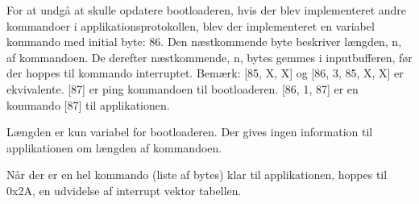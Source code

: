 For at undgå at skulle opdatere bootloaderen, hvis der blev implementeret andre kommandoer i applikationsprotokollen, blev der implementeret en variabel kommando med initial byte: 86.
Den næstkommende byte beskriver længden, n, af kommandoen. De derefter næstkommende, n, bytes gemmes i inputbufferen, før der hoppes til kommando interruptet.
Bemærk:
[85, X, X] og [86, 3, 85, X, X] er ekvivalente.
[87] er ping kommandoen til bootloaderen. [86, 1, 87] er en kommando [87] til applikationen.

Længden er kun variabel for bootloaderen. Der gives ingen information til applikationen om længden af kommandoen.

Når der er en hel kommando (liste af bytes) klar til applikationen, hoppes til 0x2A, en udvidelse af interrupt vektor tabellen.
